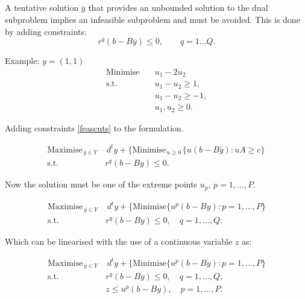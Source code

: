 \newpage
\subsection*{}

A tentative solution $\overline{y}$ that provides an unbounded  solution to the dual subproblem  implies an infeasible  subproblem and must be avoided.  This is done by  adding  constraints:
\begin{equation}
\label{feascuts}
r^q(b-B\overline{y}) \leq 0, \qquad q=1 \dots Q.
\end{equation}



\begin{bclogo}[logo=\bccrayon]{\small Example:  $y = (1,1)$ }
\small \vspace{-.5cm}
\begin{align*}
\textrm{Minimise} \quad &  u_1 - 2u_2 \\
\textrm{s.t.} \quad & u_1 -  u_2  \geq 1, \\
& u_1 -u_2 \geq -1, \\
& u_1, u_2 \geq 0.
\end{align*}
\end{bclogo}

Adding  constraints \eqref{feascuts} to the  formulation.
\vspace{-0.5cm}

\begin{align*}
\textrm{Maximise}_{\, \overline{y} \in Y \,}  & \, d^ty + \{ \textrm{Minimise}_{\, u\geq 0 \,} \{ u(b-B\overline{y})
: uA \geq c\}\, \\
\textrm{s.t.} \quad & r^q(b-By) \leq 0.
\end{align*}

Now the solution must be one of the extreme points $u_p, \, p=1,\hdots,P. $
\vspace{-0.5cm}

\begin{align*}
\textrm{Maximise}_{\, \overline{y} \in Y \,}  & \,  d^ty + \{ \textrm{Minimise}\{u^p(b-By): p=1,\hdots,P \} \\
\textrm{s.t.} \quad & r^q(b-By) \leq 0, \quad  q=1,\hdots,Q.
\end{align*}

Which can be linearised with the use of a continuous variable $z$ as:
\vspace{-0.5cm}

\begin{align*}
\textrm{Maximise}_{\, \overline{y} \in Y \,}  & \,  d^ty + \{ \textrm{Minimise}\{u^p(b-By): p=1,\hdots,P \} \\
\textrm{s.t.} \quad & r^q(b-By) \leq 0, \quad  q=1,\hdots,Q,\\
& z \leq u^p(b-By), \quad  p=1,\hdots,P.
\end{align*}



